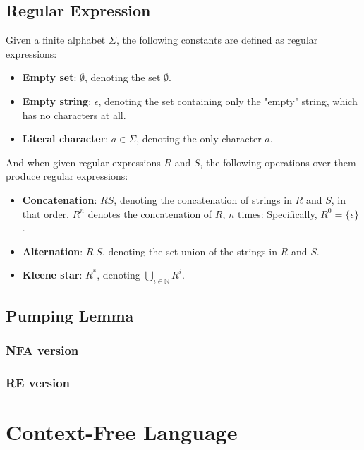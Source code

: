 \documentclass{report}
\begin{document}
		\subsection{Regular Expression}
			\begin{defn} \label{def_RE}
				Given a finite alphabet $\Sigma$, the following constants are defined as regular expressions:
				\begin{itemize}
					\item \textbf{Empty set}: $\emptyset$, denoting the set $\emptyset$.
					\item \textbf{Empty string}: $\epsilon$, denoting the set containing only the "empty" string, which has no characters at all.
					\item \textbf{Literal character}: $a \in \Sigma$, denoting the only character $a$.
				\end{itemize}
				And when given regular expressions $R$ and $S$, the following operations over them produce regular expressions:
				\begin{itemize}
					\item \textbf{Concatenation}: $RS$, denoting the concatenation of strings in $R$ and $S$, in that order.
						\subitem $R^n$ denotes the concatenation of $R$, $n$ times: Specifically, $R^0=\{\epsilon\}$.
					\item \textbf{Alternation}: $R|S$, denoting the set union of the strings in $R$ and $S$.
					\item \textbf{Kleene star}: $R^*$, denoting $\bigcup_{i \in \mathbb{N}}R^i$.
				\end{itemize}
			\end{defn}
		
		\subsection{Pumping Lemma}
			\subsubsection{NFA version}
			
			\subsubsection{RE version}
	
	\section{Context-Free Language}
\end{document}
